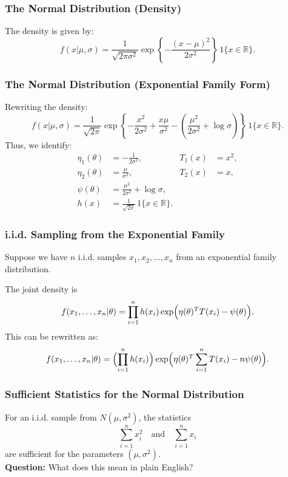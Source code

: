 \documentclass{beamer}
\begin{document}
\begin{frame}
\frametitle{The Normal Distribution (Density)}
The density is given by:
\[
f(x|\mu,\sigma) = \frac{1}{\sqrt{2\pi\sigma^2}} \exp\left\{-\frac{(x-\mu)^2}{2\sigma^2}\right\} \, 1\{x \in \mathbb{R}\}.
\]
\end{frame}

\begin{frame}
\frametitle{The Normal Distribution (Exponential Family Form)}
Rewriting the density:
\[
f(x|\mu,\sigma) = \frac{1}{\sqrt{2\pi}} \exp\!\left\{-\frac{x^2}{2\sigma^2} + \frac{x\mu}{\sigma^2} -\left(\frac{\mu^2}{2\sigma^2} + \log\sigma\right)\right\} \, 1\{x\in\mathbb{R}\}.
\]
Thus, we identify:
\begin{align*}
\eta_1(\theta) &= -\frac{1}{2\sigma^2}, \quad &T_1(x) &= x^2,\\[1mm]
\eta_2(\theta) &= \frac{\mu}{\sigma^2}, \quad &T_2(x) &= x,\\[1mm]
\psi(\theta) &= \frac{\mu^2}{2\sigma^2} + \log\sigma,\\[1mm]
h(x) &= \frac{1}{\sqrt{2\pi}} \, 1\{x\in\mathbb{R}\}.
\end{align*}
\end{frame}

\begin{frame}
\frametitle{i.i.d. Sampling from the Exponential Family}
Suppose we have $n$ i.i.d. samples $x_1,x_2,\dots,x_n$ from an exponential family distribution. 

\vspace*{1em}
The joint density is 
\[
f(x_1,\dots,x_n|\theta) = \prod_{i=1}^n h(x_i)\exp\Bigl(\eta(\theta)^T T(x_i) - \psi(\theta)\Bigr).
\]
This can be rewritten as:
\[
f(x_1,\dots,x_n|\theta) = \Bigl(\prod_{i=1}^n h(x_i)\Bigr)\exp\Bigl(\eta(\theta)^T \sum_{i=1}^n T(x_i) - n\psi(\theta)\Bigr).
\]
\end{frame}

\begin{frame}
\frametitle{Sufficient Statistics for the Normal Distribution}
For an i.i.d. sample from $N(\mu,\sigma^2)$, the statistics
\[
\sum_{i=1}^n x_i^2 \quad \text{and} \quad \sum_{i=1}^n x_i
\]
are sufficient for the parameters $(\mu,\sigma^2)$.\\[1em]
\textbf{Question:} What does this mean in plain English?
\end{frame}
\end{document}

